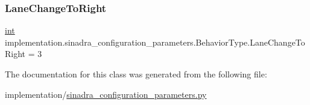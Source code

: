 \mbox{\label{classimplementation_1_1sinadra__configuration__parameters_1_1_behavior_type_a5a1cb89e84054858ec7dc07945b526bf}} 
\subsubsection{\texorpdfstring{Lane\+Change\+To\+Right}{LaneChangeToRight}}
{\footnotesize\ttfamily \hyperlink{namespaceimplementation_1_1sinadra__configuration__parameters_a1053d4f6819fcba166f4cf443ab0123d}{int} implementation.\+sinadra\+\_\+configuration\+\_\+parameters.\+Behavior\+Type.\+Lane\+Change\+To\+Right = 3\hspace{0.3cm}{\ttfamily [static]}}



The documentation for this class was generated from the following file\+:\begin{DoxyCompactItemize}
\item 
implementation/\hyperlink{sinadra__configuration__parameters_8py}{sinadra\+\_\+configuration\+\_\+parameters.\+py}\end{DoxyCompactItemize}
